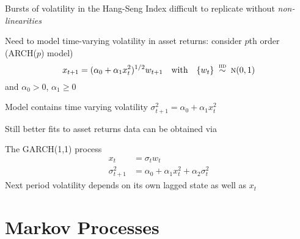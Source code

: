 \begin{frame}

    \vspace{2em}
    Bursts of volatility in the Hang-Seng Index difficult to replicate
    without \emph{non-linearities}
    
    Need to model time-varying volatility in asset returns: consider $p$th
    order  (ARCH($p$) model)
    \begin{equation}
        \label{eq:arch}
        x_{t+1} = (\alpha_0 + \alpha_1 x_t^2)^{1/2} w_{t+1}
        \quad \text{with} \quad \{ w_t \} \stackrel {\textrm{ {\sc iid }}} {\sim} \textrm{\sc n}(0,1)
    \end{equation}
    and $\alpha_0 > 0$, $\alpha_1 \geq 0$
    
    \vspace{1em}
    Model contains time varying volatility $\sigma_{t+1}^2 =
    \alpha_0 + \alpha_1 x_t^2$
    
\end{frame}

\begin{frame}

    \vspace{2em}
    Still better fits to asset returns data can be obtained via 
    
    \vspace{2em}
    The GARCH(1,1) process
    \begin{align*}
        x_t &= \sigma_t w_t \\
        \sigma_{t+1}^2 &= \alpha_0 + \alpha_1 x_t^2 + \alpha_2 \sigma_t^2
    \end{align*}
    Next period volatility depends on its own lagged state as well as $x_t$
    
\end{frame}

\section{Markov Processes}

